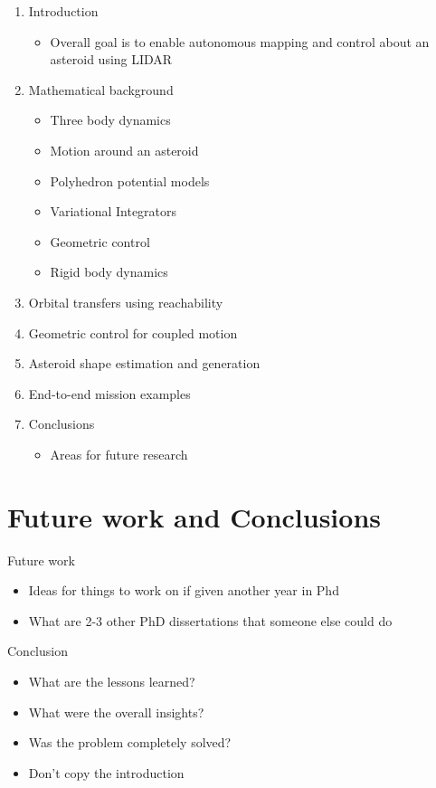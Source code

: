 \begin{enumerate}
    \item Introduction
        \begin{itemize}
            \item Overall goal is to enable autonomous mapping and control about an asteroid using LIDAR
        \end{itemize}
    \item Mathematical background
        \begin{itemize}
            \item Three body dynamics
            \item Motion around an asteroid
            \item Polyhedron potential models
            \item Variational Integrators
            \item Geometric control
            \item Rigid body dynamics
        \end{itemize}
    \item Orbital transfers using reachability
    \item Geometric control for coupled motion
    \item Asteroid shape estimation and generation
    \item End-to-end mission examples
    \item Conclusions
        \begin{itemize}
            \item Areas for future research
        \end{itemize}
\end{enumerate}

\section{Future work and Conclusions}

Future work
\begin{itemize}
    \item Ideas for things to work on if given another year in Phd
    \item What are 2-3 other PhD dissertations that someone else could do
\end{itemize}

Conclusion
\begin{itemize}
    \item What are the lessons learned?
    \item What were the overall insights?
    \item Was the problem completely solved? 
    \item Don't copy the introduction
\end{itemize}

